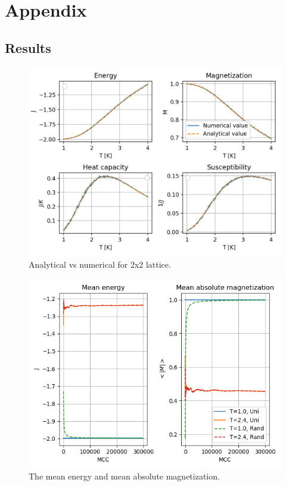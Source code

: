 \documentclass{article}
\begin{document}
\clearpage

\appendix %

\section{Appendix}

\subsection*{Results}

\begin{figure}[H]
	\centering
	\includegraphics[width=\linewidth]{Exp_values_2x2_5e5.png}
	\caption{Analytical vs numerical for 2x2 lattice. }
	\label{fig:exp_val}
\end{figure}

\begin{figure}[H]
	\centering
	\includegraphics[width=\linewidth]{Uni_vs_rand.png}
	\caption{The mean energy and mean absolute magnetization.}
	\label{fig:mean_em}
\end{figure}
\end{document}
